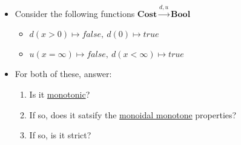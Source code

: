 \begin{itemize}
    \item Consider the following functions $\mathbf{Cost} \xrightarrow{d,u} \mathbf{Bool}$
          \begin{itemize}
            \item $d(x>0)\mapsto false,\ d(0)\mapsto true$
            \item $u(x=\infty)\mapsto false,\ d(x < \infty) \mapsto true$
          \end{itemize}
    \item For both of these, answer:
          \begin{enumerate}
            \item Is it \href{doc/1 math/Seven Sketches in Compositionality/Chapter 1: Generative Effects/4 Monotone maps/1 Monotone map}{monotonic}?
            \item If so, does it satsify the \href{doc/1 math/Seven Sketches in Compositionality/Chapter 2: Resource theories/2 Symmetric monoidal preorders/5 Monoidal monotone maps/1 Monoidal monotone}{monoidal monotone} properties?
            \item If so, is it strict?
          \end{enumerate}
  \end{itemize}
